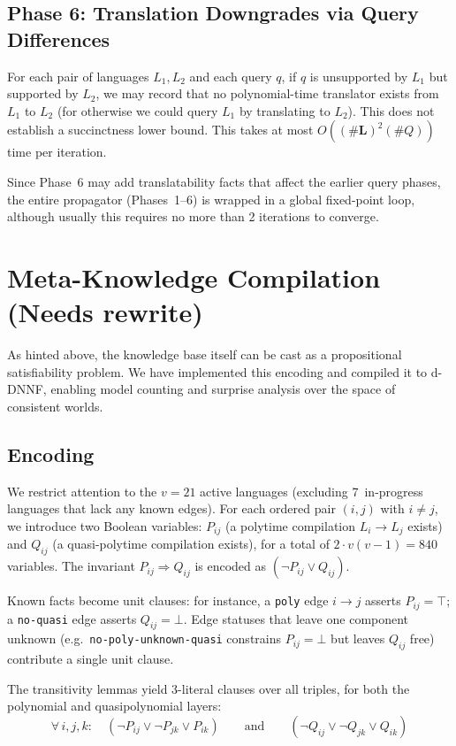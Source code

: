 \documentclass[10pt]{article}
\theoremstyle{plain}
\theoremstyle{definition}
\theoremstyle{remark}
\begin{document}
\subsection{Phase 6: Translation Downgrades via Query Differences}

For each pair of languages $L_1, L_2$ and each query $q$, if $q$ is unsupported by $L_1$ but supported by $L_2$, we may record that no polynomial-time translator exists from $L_1$ to $L_2$ (for otherwise we could query $L_1$ by translating to $L_2$). This does not establish a succinctness lower bound. This takes at most $O((\#\textbf{L})^2(\#Q))$ time per iteration.

Since Phase~6 may add translatability facts that affect the earlier query phases, the entire propagator (Phases~1--6) is wrapped in a global fixed-point loop, although usually this requires no more than 2 iterations to converge.

\section{Meta-Knowledge Compilation (Needs rewrite)}

As hinted above, the knowledge base itself can be cast as a propositional satisfiability problem. We have implemented this encoding and compiled it to d-DNNF, enabling model counting and surprise analysis over the space of consistent worlds.

\subsection{Encoding}

We restrict attention to the $v = 21$ active languages (excluding 7~in-progress languages that lack any known edges). For each ordered pair $(i,j)$ with $i \neq j$, we introduce two Boolean variables: $P_{ij}$ (a polytime compilation $L_i \to L_j$ exists) and $Q_{ij}$ (a quasi-polytime compilation exists), for a total of $2 \cdot v(v-1) = 840$ variables. The invariant $P_{ij} \Rightarrow Q_{ij}$ is encoded as $(\lnot P_{ij} \lor Q_{ij})$.

Known facts become unit clauses: for instance, a \texttt{poly} edge $i \to j$ asserts $P_{ij} = \top$; a \texttt{no-quasi} edge asserts $Q_{ij} = \bot$. Edge statuses that leave one component unknown (e.g.\ \texttt{no-poly-unknown-quasi} constrains $P_{ij} = \bot$ but leaves $Q_{ij}$ free) contribute a single unit clause.

The transitivity lemmas yield 3-literal clauses over all triples, for both the polynomial and quasipolynomial layers:
\[
  \forall\, i,j,k:\quad (\lnot P_{ij} \lor \lnot P_{jk} \lor P_{ik}) \qquad\text{and}\qquad (\lnot Q_{ij} \lor \lnot Q_{jk} \lor Q_{ik})
\]
\end{document}
